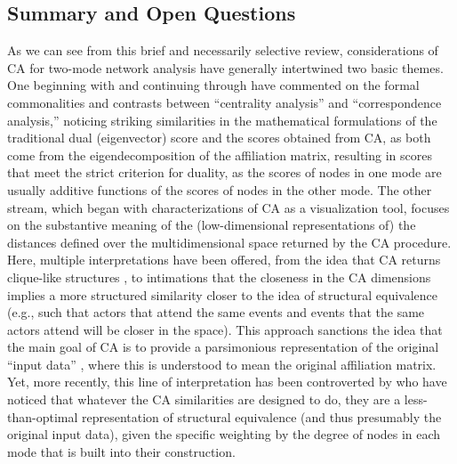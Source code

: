 \documentclass[a4paper,fleqn]{cas-sc}
\begin{document}
\subsection{Summary and Open Questions}
As we can see from this brief and necessarily selective review, considerations of CA for two-mode network analysis have generally intertwined two basic themes. One beginning with \citet{bonacich1991simultaneous} and continuing through \citet{faust1997centrality, faust2005using} have commented on the formal commonalities and contrasts between ``centrality analysis'' and ``correspondence analysis,'' noticing striking similarities in the mathematical formulations of the traditional dual (eigenvector) score and the scores obtained from CA, as both come from the eigendecomposition of the affiliation matrix, resulting in scores that meet the strict criterion for duality, as the scores of nodes in one mode are usually additive functions of the scores of nodes in the other mode. The other stream, which began with characterizations of CA as a visualization tool, focuses on the substantive meaning of the (low-dimensional representations of) the distances defined over the multidimensional space returned by the CA procedure. Here, multiple interpretations have been offered, from the idea that CA returns clique-like structures \citep{bonacich1991simultaneous}, to intimations that the closeness in the CA dimensions implies a more structured similarity closer to the idea of structural equivalence (e.g., such that actors that attend the same events and events that the same actors attend will be closer in the space). This approach sanctions the idea that the main goal of CA is to provide a parsimonious representation of the original ``input data'' \citep{faust2005using}, where this is understood to mean the original affiliation matrix. Yet, more recently, this line of interpretation has been controverted by  \citep{desposito2014comparison} who have noticed that whatever the CA similarities are designed to do, they are a less-than-optimal representation of structural equivalence (and thus presumably the original input data), given the specific weighting by the degree of nodes in each mode that is built into their construction. 
\end{document}
